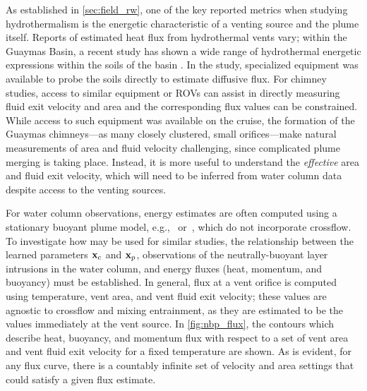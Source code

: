 As established in \cref{sec:field_rw}, one of the key reported metrics when studying hydrothermalism is the energetic characteristic of a venting source and the plume itself. Reports of estimated heat flux from hydrothermal vents vary; within the Guaymas Basin, a recent study has shown a wide range of hydrothermal energetic expressions within the soils of the basin \autocite{geilert2018formation}. In the study, specialized equipment was available to probe the soils directly to estimate diffusive flux. For chimney studies, access to similar equipment or ROVs can assist in directly measuring fluid exit velocity and area and the corresponding flux values can be constrained. While access to such equipment was available on the cruise, the formation of the Guaymas chimneys---as many closely clustered, small orifices---make natural measurements of area and fluid velocity challenging, since complicated plume merging is taking place. Instead, it is more useful to understand the \emph{effective} area and fluid exit velocity, which will need to be inferred from water column data despite access to the venting sources. 

For water column observations, energy estimates are often computed using a stationary buoyant plume model, e.g.,~\cite{morton1956turbulent} or~\cite{speer1989model}, which do not incorporate crossflow. To investigate how \PHUMES may be used for similar studies, the relationship between the learned parameters $\mathbf{x}_c$ and $\mathbf{x}_p$, observations of the neutrally-buoyant layer intrusions in the water column, and energy fluxes (heat, momentum, and buoyancy) must be established. In general, flux at a vent orifice is computed using temperature, vent area, and vent fluid exit velocity; these values are agnostic to crossflow and mixing entrainment, as they are estimated to be the values immediately at the vent source. In \cref{fig:nbp_flux}, the contours which describe heat, buoyancy, and momentum flux with respect to a set of vent area and vent fluid exit velocity for a fixed temperature are shown. As is evident, for any flux curve, there is a countably infinite set of velocity and area settings that could satisfy a given flux estimate.

